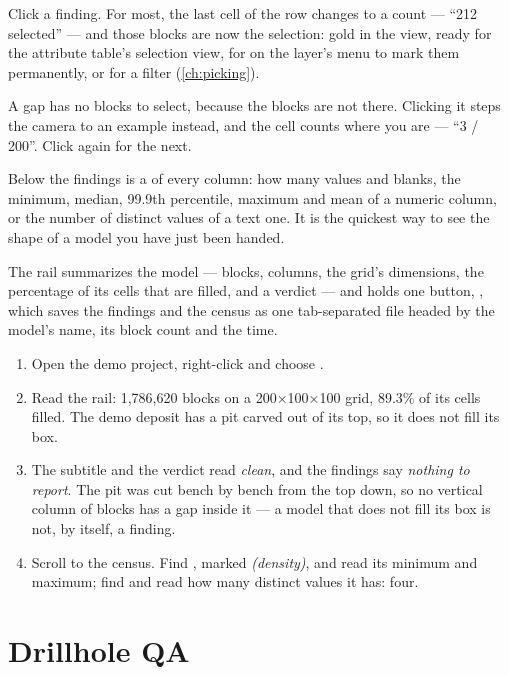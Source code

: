 Click a finding. For most, the last cell of the row changes to a count — “212 selected” — and those blocks are now the selection: gold in the view, ready for the attribute table's selection view, for  on the layer's menu to mark them permanently, or for a filter (\cref{ch:picking}).

A gap has no blocks to select, because the blocks are not there. Clicking it steps the camera to an example instead, and the cell counts where you are — “3 / 200”. Click again for the next.

Below the findings is a  of every column: how many values and blanks, the minimum, median, 99.9th percentile, maximum and mean of a numeric column, or the number of distinct values of a text one. It is the quickest way to see the shape of a model you have just been handed.

The rail summarizes the model — blocks, columns, the grid's dimensions, the percentage of its cells that are filled, and a verdict — and holds one button, , which saves the findings and the census as one tab-separated file headed by the model's name, its block count and the time.

\begin{tryit}
\begin{enumerate}
\item Open the demo project, right-click  and choose .
\item Read the rail: 1,786,620 blocks on a 200×100×100 grid, 89.3\% of its cells filled. The demo deposit has a pit carved out of its top, so it does not fill its box.
\item The subtitle and the verdict read \emph{clean}, and the findings say \emph{nothing to report}. The pit was cut bench by bench from the top down, so no vertical column of blocks has a gap inside it — a model that does not fill its box is not, by itself, a finding.
\item Scroll to the census. Find , marked \emph{(density)}, and read its minimum and maximum; find  and read how many distinct values it has: four.
\end{enumerate}
\end{tryit}

\section{Drillhole QA}\label{sec:qa-dh}

